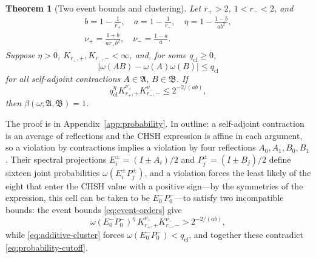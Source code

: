 \documentclass[aps,prl,reprint,longbibliography,raggedbottom]{revtex4-2}
\newtheorem{theorem}{Theorem}
\newcommand{\abs}[1]{\lvert #1\rvert}
\newcommand{\A}{\mathfrak A}
\newcommand{\B}{\mathfrak B}
\begin{document}
\begin{theorem}[Two event bounds and clustering]\label{thm:probability}
Let $r_+>2$, $1<r_-<2$, and
\begin{equation}
\begin{gathered}
b=1-\frac1{r_+},\quad a=1-\frac1{r_-},\quad
\eta=1-\frac{1-b}{ab^2},\\
\nu_+=\frac{1+b}{ar_+b^2},\quad \nu_-=\frac{1-a}{a}.
\end{gathered}
\label{eq:probability-exponents}
\end{equation}
Suppose $\eta>0$, $K_{r_+,+},K_{r_-,-}<\infty$, and, for some
$q_{\mathrm{cl}}\ge0$,
\begin{equation}
\abs{\omega(AB)-\omega(A)\omega(B)}\le q_{\mathrm{cl}}
\label{eq:additive-cluster}
\end{equation}
for all self-adjoint contractions $A\in\A$, $B\in\B$. If
\begin{equation}
q_{\mathrm{cl}}^{\eta}K_{r_+,+}^{\nu_+}K_{r_-,-}^{\nu_-}\le2^{-2/(ab)},
\label{eq:probability-cutoff}
\end{equation}
then $\beta(\omega;\A,\B)=1$.
\end{theorem}

The proof is in Appendix~\ref{app:probability}. In outline: a
self-adjoint contraction is an average of reflections and the CHSH
expression is affine in each argument, so a violation by contractions
implies a violation by four reflections $A_0,A_1,B_0,B_1$. Their
spectral projections $E_i^\pm=(I\pm A_i)/2$ and $P_j^\pm=(I\pm B_j)/2$
define sixteen joint probabilities $\omega(E_i^\pm P_j^\pm)$, and a
violation forces the least likely of the eight that enter the CHSH
value with a positive sign---by the symmetries of the expression, this
cell can be taken to be $E_0^-P_0^-$---to satisfy two incompatible
bounds: the event bounds \eqref{eq:event-orders} give
\begin{equation}
\omega(E_0^-P_0^-)^{\eta}\,K_{r_+,+}^{\nu_+}K_{r_-,-}^{\nu_-}
>2^{-2/(ab)},
\label{eq:outline-lower}
\end{equation}
while \eqref{eq:additive-cluster} forces
$\omega(E_0^-P_0^-)<q_{\mathrm{cl}}$, and together these contradict
\eqref{eq:probability-cutoff}.
\end{document}
